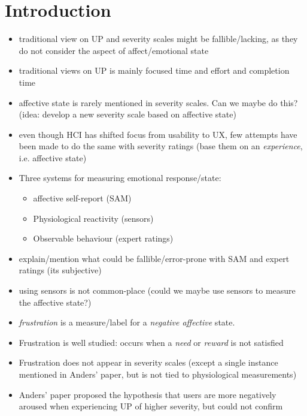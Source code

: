 
\section{Introduction}

\begin{itemize}
    \item traditional view on UP and severity scales might be fallible/lacking,
        as they do not consider the aspect of affect/emotional state
    \item traditional views on UP is mainly focused time and effort and completion
        time
    \item affective state is rarely mentioned in severity scales. Can we maybe
do this? (idea: develop a new severity scale based on affective state)
    \item even though HCI has shifted focus from usability to UX, few attempts have
        been made to do the same with severity ratings (base them on an
        \textit{experience}, i.e. affective state)
    \item Three systems for measuring emotional response/state:
        \begin{itemize}
            \item affective self-report (SAM)
            \item Physiological reactivity (sensors)
            \item Observable behaviour (expert ratings)
        \end{itemize}
    \item explain/mention what could be fallible/error-prone with SAM and expert
        ratings (its subjective)
    \item using sensors is not common-place (could we maybe use sensors to
        measure the affective state?)
    \item \textit{frustration} is a measure/label for a \textit{negative
        affective} state.
    \item Frustration is well studied: occurs when a \textit{need} or
        \textit{reward} is not satisfied
    \item Frustration does not appear in severity scales (except a single instance mentioned in Anders' paper, but is not tied to physiological measurements)
    \item Anders' paper proposed the hypothesis that users are more negatively
        aroused when experiencing UP of higher severity, but could not confirm

\end{itemize}
